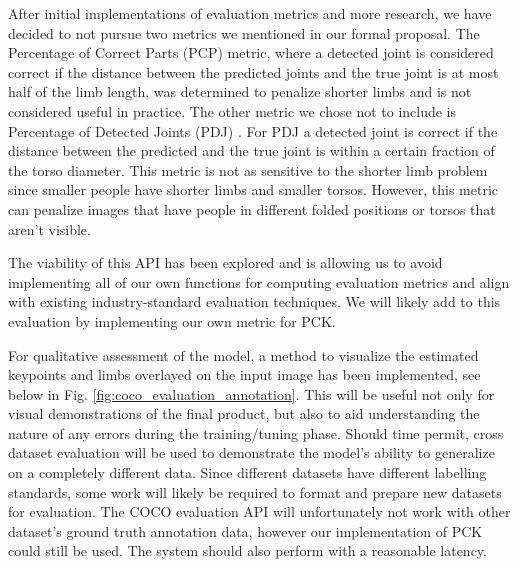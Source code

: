 \documentclass[11pt, letterpaper]{article}
\begin{document}
After initial implementations of evaluation metrics and more research, we have decided to not pursue two metrics we mentioned in our formal proposal. The Percentage of Correct Parts (PCP) \cite{Cbsudux_2019} metric, where a detected joint is considered correct if the distance between the predicted joints and the true joint is at most half of the limb length, was determined to penalize shorter limbs and is not considered useful in practice. The other metric we chose not to include is Percentage of Detected Joints (PDJ) \cite{Cbsudux_2019}. For PDJ a detected joint is correct if the distance between the predicted and the true joint is within a certain fraction of the torso diameter. This metric is not as sensitive to the shorter limb problem since smaller people have shorter limbs and smaller torsos. However, this metric can penalize images that have people in different folded positions or torsos that aren’t visible.

The viability of this API has been explored and is allowing us to avoid implementing all of our own functions for computing evaluation metrics and align with existing industry-standard evaluation techniques. We will likely add to this evaluation by implementing our own metric for PCK.

For qualitative assessment of the model, a method to visualize the estimated keypoints and limbs overlayed on the input image has been implemented, see below in Fig. \ref{fig:coco_evaluation_annotation}. This will be useful not only for visual demonstrations of the final product, but also to aid understanding the nature of any errors during the training/tuning phase. Should time permit, cross dataset evaluation will be used to demonstrate the model’s ability to generalize on a completely different data. Since different datasets have different labelling standards, some work will likely be required to format and prepare new datasets for evaluation. The COCO evaluation API will unfortunately not work with other dataset’s ground truth annotation data, however our implementation of PCK could still be used. The system should also perform with a reasonable latency.
\end{document}
